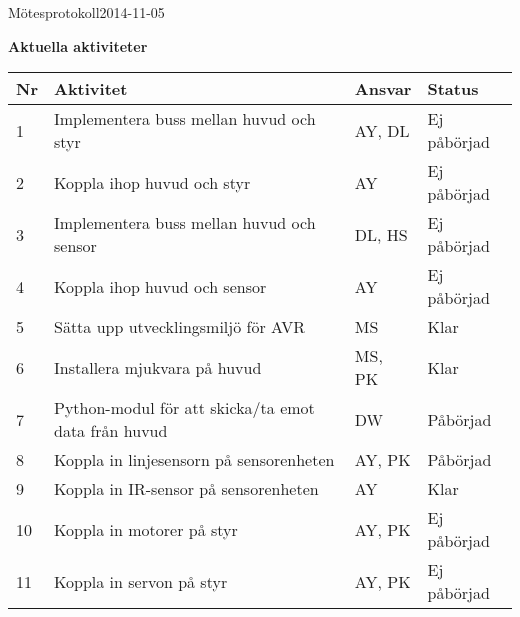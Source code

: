 \documentclass[titlepage, a4paper]{article}
\begin{document}
\begin{projektmote}{Mötesprotokoll}{2014-11-05}
\end{projektmote}


\newpage
\textbf{\Large Aktuella aktiviteter}
\begin{center}
\begin{tabularx}{\textwidth}{| p{4mm} | X | p{13.5mm} | X |}
	\hline
	\textbf{Nr} & \textbf{Aktivitet} & \textbf{Ansvar} & \textbf{Status} \\\hline	
	{1} & {Implementera buss mellan huvud och styr} & {AY, DL} & {Ej påbörjad} \\\hline
	{2} & {Koppla ihop huvud och styr} & {AY} & {Ej påbörjad} \\\hline
	{3} & {Implementera buss mellan huvud och sensor} & {DL, HS} & {Ej påbörjad} \\\hline
	{4} & {Koppla ihop huvud och sensor} & {AY} & {Ej påbörjad} \\\hline
	{5} & {Sätta upp utvecklingsmiljö för AVR} & {MS} & {Klar} \\\hline
	{6} & {Installera mjukvara på huvud} & {MS, PK} & {Klar} \\\hline
	{7} & {Python-modul för att skicka/ta emot data från huvud} & {DW} & {Påbörjad} \\\hline
	{8} & {Koppla in linjesensorn på sensorenheten} & {AY, PK} & {Påbörjad} \\\hline
	{9} & {Koppla in IR-sensor på sensorenheten} & {AY} & {Klar} \\\hline
	{10} & {Koppla in motorer på styr} & {AY, PK} & {Ej påbörjad} \\\hline
	{11} & {Koppla in servon på styr} & {AY, PK} & {Ej påbörjad} \\\hline
\end{tabularx}
\end{center}
\end{document}

